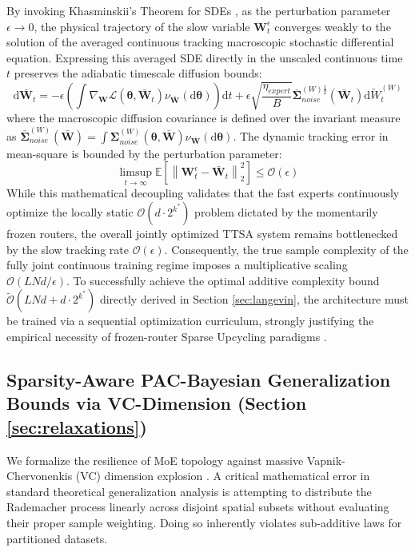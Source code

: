 \documentclass{article}
\newcommand{\E}{\mathbb{E}}
\newcommand{\1}{\mathbb{I}}
\newcommand{\diff}{\mathrm{d}}
\newcommand{\Loss}{\mathcal{L}}
\newcommand{\norm}[1]{\left\lVert#1\right\rVert}
\newcommand{\calO}{\mathcal{O}}
\newcommand{\btheta}{\boldsymbol{\theta}}
\newcommand{\bW}{\mathbf{W}}
\newcommand{\bSigma}{\boldsymbol{\Sigma}}
\begin{document}
By invoking Khasminskii's Theorem for SDEs \citep{khasminskii1966stochastic}, as the perturbation parameter $\epsilon \to 0$, the physical trajectory of the slow variable $\bW_t^\epsilon$ converges weakly to the solution of the averaged continuous tracking macroscopic stochastic differential equation. Expressing this averaged SDE directly in the unscaled continuous time $t$ preserves the adiabatic timescale diffusion bounds:
\begin{equation}
    \diff \bar{\bW}_t = -\epsilon \left( \int \nabla_{\bW} \Loss(\btheta, \bar{\bW}_t) \nu_{\bar{\bW}}(\diff \btheta) \right) \diff t + \epsilon \sqrt{\frac{\eta_{expert}}{B}} \bar{\bSigma}_{noise}^{(W)\frac{1}{2}}(\bar{\bW}_t) \diff \tilde{W}_t^{(W)}
\end{equation}
where the macroscopic diffusion covariance is defined over the invariant measure as $\bar{\bSigma}_{noise}^{(W)}(\bar{\bW}) = \int \bSigma_{noise}^{(W)}(\btheta, \bar{\bW}) \nu_{\bar{\bW}}(\diff \btheta)$. The dynamic tracking error in mean-square is bounded by the perturbation parameter:
\begin{equation}
\label{eq: rate bound}
    \limsup_{t \to \infty} \E\left[\norm{\bW_t^\epsilon - \bar{\bW}_t}_2^2\right] \le \calO(\epsilon)
\end{equation}
While this mathematical decoupling validates that the fast experts continuously optimize the locally static $\calO(d \cdot 2^{k^*})$ problem dictated by the momentarily frozen routers, the overall jointly optimized TTSA system remains bottlenecked by the slow tracking rate $\calO(\epsilon)$. Consequently, the true sample complexity of the fully joint continuous training regime imposes a multiplicative scaling $\calO(L N d / \epsilon)$. To successfully achieve the optimal additive complexity bound $\tilde{\calO}(L N d + d \cdot 2^{k^*})$ directly derived in Section \ref{sec:langevin}, the architecture must be trained via a sequential optimization curriculum, strongly justifying the empirical necessity of frozen-router Sparse Upcycling paradigms \citep{komatsuzaki2023sparse}.

\subsection{Sparsity-Aware PAC-Bayesian Generalization Bounds via VC-Dimension (Section \ref{sec:relaxations})}
\label{app:defense_generalization}

We formalize the resilience of MoE topology against massive Vapnik-Chervonenkis (VC) dimension explosion \citep{bartlett2019nearly}. A critical mathematical error in standard theoretical generalization analysis is attempting to distribute the Rademacher process linearly across disjoint spatial subsets without evaluating their proper sample weighting. Doing so inherently violates sub-additive laws for partitioned datasets. 
\end{document}
